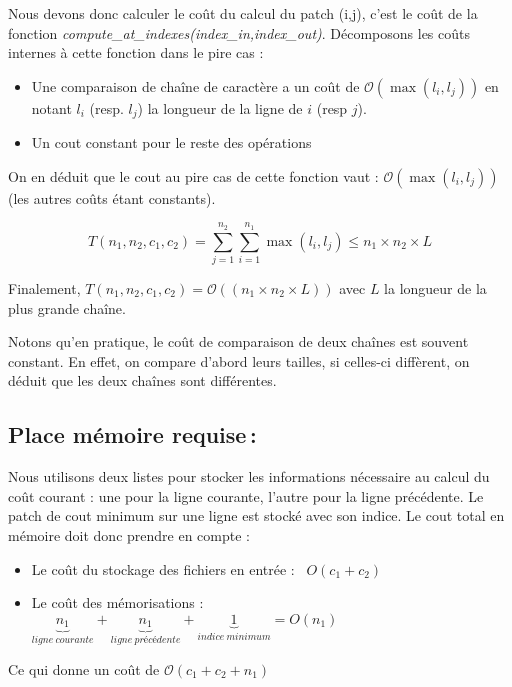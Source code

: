 \documentclass[a4paper, 10pt, french]{article}
\newcommand{\cplx}[1]{\mathcal O \left( #1 \right)}
\begin{document}
	Nous devons donc calculer le coût du calcul du patch (i,j), c'est le coût de la fonction \emph{compute\_at\_indexes(index\_in,index\_out)}.
	Décomposons les coûts internes à cette fonction dans le pire cas :
	\begin{itemize}
	\item Une comparaison de chaîne de caractère a un coût de $\cplx{\max(l_i,l_j)}$ en notant $l_i$ (resp. $l_j$) la longueur de la ligne de $i$ (resp $j$).
	\item Un cout constant pour le reste des opérations
	\end{itemize}

	On en déduit que le cout au pire cas de cette fonction vaut : $\cplx{\max(l_i,l_j)}$ (les autres coûts étant constants).

	\[T(n_1,n_2,c_1,c_2) = \sum_{j=1}^{n_2} \sum_{i=1}^{n_1} \max(l_i,l_j) \leq n_1 \times n_2 \times L\]

	Finalement, $T(n_1,n_2,c_1,c_2) = \cplx{(n_1 \times n_2 \times L)}$ avec $L$ la longueur de la plus grande chaîne.

    Notons qu'en pratique, le coût de comparaison de deux chaînes est souvent constant. En effet, on compare d'abord leurs tailles, si celles-ci diffèrent, on déduit
    que les deux chaînes sont différentes.

  \subsection{Place mémoire requise\,: }
	Nous utilisons deux listes pour stocker les informations nécessaire au calcul du coût courant : une pour la ligne courante, l'autre pour la ligne
    précédente. Le patch de cout minimum sur une ligne est stocké avec son indice.
    Le cout total en mémoire doit donc prendre en compte :
    \begin{itemize}
    \item Le coût du stockage des fichiers en entrée : \ $O(c_1 + c_2)$
    \item Le coût des mémorisations :  $\underbrace{n_1}_{ligne\ courante} + \underbrace{n_1}_{ligne\ précédente} + \underbrace{1}_{indice \ minimum} = O(n_1)$
    \end{itemize}

    Ce qui donne un coût de $\cplx{c_1 + c_2 + n_1}$
\end{document}
